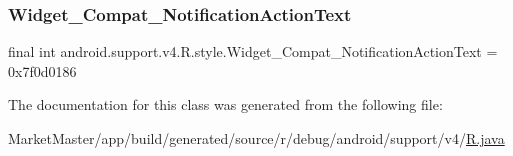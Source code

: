 \subsubsection{\texorpdfstring{Widget\+\_\+\+Compat\+\_\+\+Notification\+Action\+Text}{Widget\_Compat\_NotificationActionText}}
{\footnotesize\ttfamily final int android.\+support.\+v4.\+R.\+style.\+Widget\+\_\+\+Compat\+\_\+\+Notification\+Action\+Text = 0x7f0d0186\hspace{0.3cm}{\ttfamily [static]}}



The documentation for this class was generated from the following file\+:\begin{DoxyCompactItemize}
\item 
Market\+Master/app/build/generated/source/r/debug/android/support/v4/\mbox{\hyperlink{debug_2android_2support_2v4_2R_8java}{R.\+java}}\end{DoxyCompactItemize}
